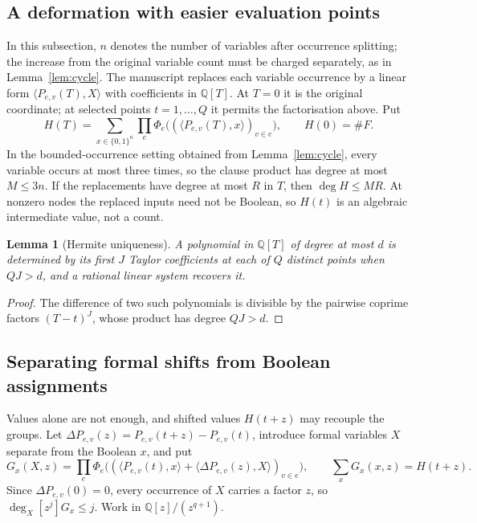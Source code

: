 \documentclass[11pt,reqno]{amsart}
\numberwithin{equation}{section}
\theoremstyle{plain}
\newtheorem{lemma}[theorem]{Lemma}
\theoremstyle{definition}
\theoremstyle{remark}
\newcommand{\Q}{\mathbb Q}
\begin{document}
\subsection{A deformation with easier evaluation points}
In this subsection, $n$ denotes the number of variables after occurrence
splitting; the increase from the original variable count must be charged
separately, as in Lemma~\ref{lem:cycle}. The manuscript replaces each
variable occurrence by a linear form
$\langle P_{e,v}(T),X\rangle$ with coefficients in $\Q[T]$. At $T=0$ it is the
original coordinate; at selected points $t=1,\dots,Q$ it permits the
factorisation above. Put
\begin{equation}\label{eq:H}
 H(T)=\sum_{x\in\{0,1\}^n}\prod_e\Phi_e\bigl((\langle P_{e,v}(T),x\rangle)_{v\in e}\bigr),
 \qquad H(0)=\#F.
\end{equation}
In the bounded-occurrence setting obtained from Lemma~\ref{lem:cycle}, every
variable occurs at most three times, so the clause product has degree at most
$M\le3n$. If the replacements have degree at most $R$ in $T$, then
$\deg H\le MR$. At nonzero nodes the replaced inputs need not be Boolean, so
$H(t)$ is an algebraic intermediate value, not a count.

\begin{lemma}[Hermite uniqueness]\label{lem:hermite}
A polynomial in $\Q[T]$ of degree at most $d$ is determined by its first $J$
Taylor coefficients at each of $Q$ distinct points when $QJ>d$, and a
rational linear system recovers it.
\end{lemma}
\begin{proof}
The difference of two such polynomials is divisible by the pairwise coprime
factors $(T-t)^J$, whose product has degree $QJ>d$.
\end{proof}

\subsection{Separating formal shifts from Boolean assignments}
Values alone are not enough, and shifted values $H(t+z)$ may recouple the
groups. Let $\Delta P_{e,v}(z)=P_{e,v}(t+z)-P_{e,v}(t)$, introduce formal
variables $X$ separate from the Boolean $x$, and put
\[
 G_x(X,z)=\prod_e\Phi_e\bigl((\langle P_{e,v}(t),x\rangle
 +\langle\Delta P_{e,v}(z),X\rangle)_{v\in e}\bigr),
 \qquad \sum_xG_x(x,z)=H(t+z).
\]
Since $\Delta P_{e,v}(0)=0$, every occurrence of $X$ carries a factor $z$,
so $\deg_X[z^j]G_x\le j$. Work in $\Q[z]/(z^{q+1})$.
\end{document}
